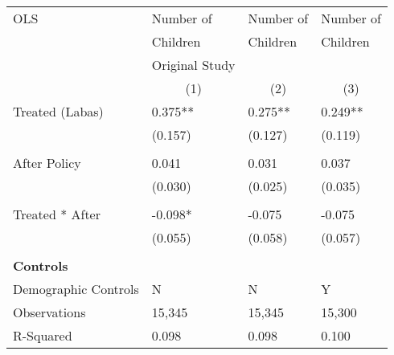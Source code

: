 \begin{tabular}{p{4cm}p{1.5cm}p{1.5cm}p{1.5cm}}
\hline\hline
OLS               &Number of & Number of &Number of \\
&Children & Children & Children\\
&Original Study & &  \\
&\multicolumn{1}{c}{(1)}&\multicolumn{1}{c}{(2)}&\multicolumn{1}{c}{(3)}\\
\hline
Treated (Labas)   &  0.375**&   0.275** & 0.249** \\
                &  (0.157)&  (0.127) & (0.119)\\
                \\
After Policy   &   0.041&   0.031 &0.037\\
                &  (0.030)&  (0.025) & (0.035)\\
                \\
Treated * After   & -0.098*&  -0.075 & -0.075\\
                &  (0.055)&  (0.058) &(0.057)\\
                \\

\multicolumn{6}{l}{\textbf{Controls}}  \\                  
Demographic Controls       &   N     &        N&        Y\\

\hline
Observations    &    15,345&    15,345 & 15,300\\
R-Squared    &  0.098   & 0.098 & 0.100     \\
\hline\hline
\end{tabular}